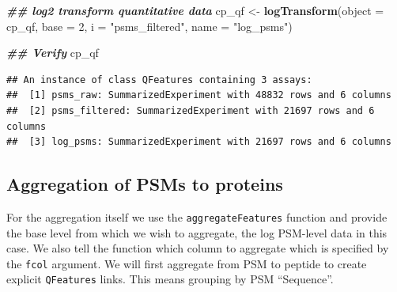 \documentclass[9pt,a4paper,]{extarticle}
\newenvironment{Shaded}{\begin{snugshade}}{\end{snugshade}}
\newcommand{\AttributeTok}[1]{\textcolor[rgb]{0.13,0.29,0.53}{#1}}
\newcommand{\DecValTok}[1]{\textcolor[rgb]{0.00,0.00,0.81}{#1}}
\newcommand{\DocumentationTok}[1]{\textcolor[rgb]{0.56,0.35,0.01}{\textbf{\textit{#1}}}}
\newcommand{\FunctionTok}[1]{\textcolor[rgb]{0.13,0.29,0.53}{\textbf{#1}}}
\newcommand{\NormalTok}[1]{#1}
\newcommand{\OtherTok}[1]{\textcolor[rgb]{0.56,0.35,0.01}{#1}}
\newcommand{\StringTok}[1]{\textcolor[rgb]{0.31,0.60,0.02}{#1}}
\begin{document}
\begin{Shaded}
\begin{Highlighting}[]
\DocumentationTok{\#\# log2 transform quantitative data}
\NormalTok{cp\_qf }\OtherTok{\textless{}{-}} \FunctionTok{logTransform}\NormalTok{(}\AttributeTok{object =}\NormalTok{ cp\_qf,}
                      \AttributeTok{base =} \DecValTok{2}\NormalTok{,}
                      \AttributeTok{i =} \StringTok{"psms\_filtered"}\NormalTok{,}
                      \AttributeTok{name =} \StringTok{"log\_psms"}\NormalTok{)}

\DocumentationTok{\#\# Verify}
\NormalTok{cp\_qf}
\end{Highlighting}
\end{Shaded}

\begin{verbatim}
## An instance of class QFeatures containing 3 assays:
##  [1] psms_raw: SummarizedExperiment with 48832 rows and 6 columns 
##  [2] psms_filtered: SummarizedExperiment with 21697 rows and 6 columns 
##  [3] log_psms: SummarizedExperiment with 21697 rows and 6 columns
\end{verbatim}

\hypertarget{aggregation-of-psms-to-proteins}{%
\subsection{Aggregation of PSMs to proteins}\label{aggregation-of-psms-to-proteins}}

For the aggregation itself we use the \texttt{aggregateFeatures} function and provide
the base level from which we wish to aggregate, the log PSM-level data in this
case. We also tell the function which column to aggregate which is specified by
the \texttt{fcol} argument. We will first aggregate from PSM to peptide to create
explicit \texttt{QFeatures} links. This means grouping by PSM ``Sequence''.
\end{document}
